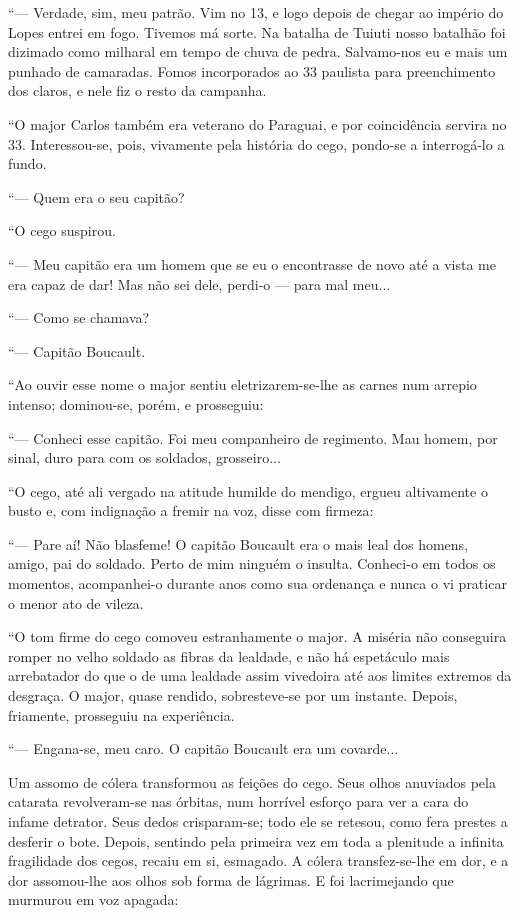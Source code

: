 ``--- Verdade, sim, meu patrão. Vim no 13, e logo depois de chegar ao
império do Lopes entrei em fogo. Tivemos má sorte. Na batalha de Tuiuti
nosso batalhão foi dizimado como milharal em tempo de chuva de pedra.
Salvamo-nos eu e mais um punhado de camaradas. Fomos incorporados ao 33
paulista para preenchimento dos claros, e nele fiz o resto da campanha.

``O major Carlos também era veterano do Paraguai, e por coincidência
servira no 33. Interessou-se, pois, vivamente pela história do cego,
pondo-se a interrogá-lo a fundo.

``--- Quem era o seu capitão?

``O cego suspirou.

``--- Meu capitão era um homem que se eu o encontrasse de novo até a
vista me era capaz de dar! Mas não sei dele, perdi-o --- para mal meu...

``--- Como se chamava?

``--- Capitão Boucault.

``Ao ouvir esse nome o major sentiu eletrizarem-se-lhe as carnes num
arrepio intenso; dominou-se, porém, e prosseguiu:

``--- Conheci esse capitão. Foi meu companheiro de regimento. Mau homem,
por sinal, duro para com os soldados, grosseiro...

``O cego, até ali vergado na atitude humilde do mendigo, ergueu
altivamente o busto e, com indignação a fremir na voz, disse com
firmeza:

``--- Pare aí! Não blasfeme! O capitão Boucault era o mais leal dos
homens, amigo, pai do soldado. Perto de mim ninguém o insulta. Conheci-o
em todos os momentos, acompanhei-o durante anos como sua ordenança e
nunca o vi praticar o menor ato de vileza.

``O tom firme do cego comoveu estranhamente o major. A miséria não
conseguira romper no velho soldado as fibras da lealdade, e não há
espetáculo mais arrebatador do que o de uma lealdade assim vivedoira até
aos limites extremos da desgraça. O major, quase rendido, sobresteve-se
por um instante. Depois, friamente, prosseguiu na experiência.

``--- Engana-se, meu caro. O capitão Boucault era um covarde...

Um assomo de cólera transformou as feições do cego. Seus olhos anuviados
pela catarata revolveram-se nas órbitas, num horrível esforço para ver a
cara do infame detrator. Seus dedos crisparam-se; todo ele se retesou,
como fera prestes a desferir o bote. Depois, sentindo pela primeira vez
em toda a plenitude a infinita fragilidade dos cegos, recaiu em si,
esmagado. A cólera transfez-se-lhe em dor, e a dor assomou-lhe aos olhos
sob forma de lágrimas. E foi lacrimejando que murmurou em voz apagada:

